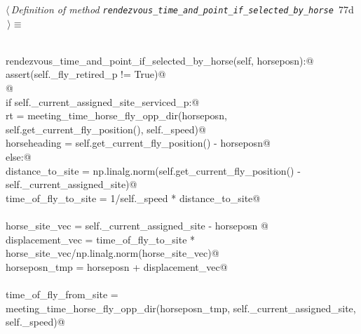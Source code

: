 \documentclass[11.5pt]{report}
\begin{document}
\vspace{-0.8cm} \newchunk  
{}
\begin{flushleft} \small\label{scrap117}\raggedright\small
{} $\langle\,${\itshape Definition of method \verb|rendezvous_time_and_point_if_selected_by_horse|}\nobreak\ {\footnotesize {77d}}$\,\rangle\equiv$
\vspace{-1ex}
\begin{list}{}{} \item
\mbox{}\verb@@\\
\mbox{}\verb@def rendezvous_time_and_point_if_selected_by_horse(self, horseposn):@\\
\mbox{}\verb@   assert(self._fly_retired_p != True)@\\
\mbox{}\verb@  @\\
\mbox{}\verb@   if self._current_assigned_site_serviced_p:@\\
\mbox{}\verb@       rt = meeting_time_horse_fly_opp_dir(horseposn, self.get_current_fly_position(), self._speed)@\\
\mbox{}\verb@       horseheading = self.get_current_fly_position() - horseposn@\\
\mbox{}\verb@   else:@\\
\mbox{}\verb@      distance_to_site    = np.linalg.norm(self.get_current_fly_position() -\@\\
\mbox{}\verb@                                           self._current_assigned_site)@\\
\mbox{}\verb@      time_of_fly_to_site = 1/self._speed * distance_to_site@\\
\mbox{}\verb@@\\
\mbox{}\verb@      horse_site_vec   = self._current_assigned_site - horseposn @\\
\mbox{}\verb@      displacement_vec = time_of_fly_to_site * horse_site_vec/np.linalg.norm(horse_site_vec)@\\
\mbox{}\verb@      horseposn_tmp   = horseposn + displacement_vec@\\
\mbox{}\verb@@\\
\mbox{}\verb@      time_of_fly_from_site = \@\\
\mbox{}\verb@               meeting_time_horse_fly_opp_dir(horseposn_tmp, self._current_assigned_site, self._speed)@\\

\end{list}
\end{flushleft}
\end{document}
